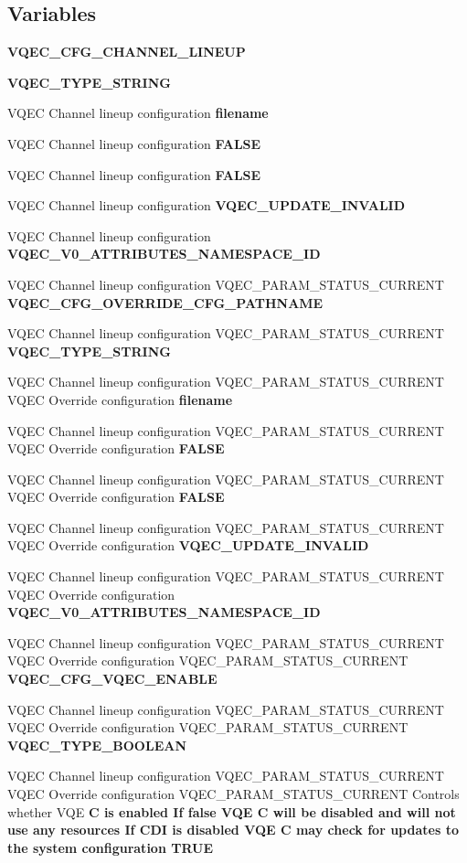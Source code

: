 \subsection*{Variables}
\begin{CompactItemize}
\item 
\bf{VQEC\_\-CFG\_\-CHANNEL\_\-LINEUP}
\item 
\bf{VQEC\_\-TYPE\_\-STRING}
\item 
VQEC Channel lineup configuration \bf{filename}
\item 
VQEC Channel lineup configuration \bf{FALSE}
\item 
VQEC Channel lineup configuration \bf{FALSE}
\item 
VQEC Channel lineup configuration \bf{VQEC\_\-UPDATE\_\-INVALID}
\item 
VQEC Channel lineup configuration \bf{VQEC\_\-V0\_\-ATTRIBUTES\_\-NAMESPACE\_\-ID}
\item 
VQEC Channel lineup configuration VQEC\_\-PARAM\_\-STATUS\_\-CURRENT \bf{VQEC\_\-CFG\_\-OVERRIDE\_\-CFG\_\-PATHNAME}
\item 
VQEC Channel lineup configuration VQEC\_\-PARAM\_\-STATUS\_\-CURRENT \bf{VQEC\_\-TYPE\_\-STRING}
\item 
VQEC Channel lineup configuration VQEC\_\-PARAM\_\-STATUS\_\-CURRENT VQEC Override configuration \bf{filename}
\item 
VQEC Channel lineup configuration VQEC\_\-PARAM\_\-STATUS\_\-CURRENT VQEC Override configuration \bf{FALSE}
\item 
VQEC Channel lineup configuration VQEC\_\-PARAM\_\-STATUS\_\-CURRENT VQEC Override configuration \bf{FALSE}
\item 
VQEC Channel lineup configuration VQEC\_\-PARAM\_\-STATUS\_\-CURRENT VQEC Override configuration \bf{VQEC\_\-UPDATE\_\-INVALID}
\item 
VQEC Channel lineup configuration VQEC\_\-PARAM\_\-STATUS\_\-CURRENT VQEC Override configuration \bf{VQEC\_\-V0\_\-ATTRIBUTES\_\-NAMESPACE\_\-ID}
\item 
VQEC Channel lineup configuration VQEC\_\-PARAM\_\-STATUS\_\-CURRENT VQEC Override configuration VQEC\_\-PARAM\_\-STATUS\_\-CURRENT \bf{VQEC\_\-CFG\_\-VQEC\_\-ENABLE}
\item 
VQEC Channel lineup configuration VQEC\_\-PARAM\_\-STATUS\_\-CURRENT VQEC Override configuration VQEC\_\-PARAM\_\-STATUS\_\-CURRENT \bf{VQEC\_\-TYPE\_\-BOOLEAN}
\item 
VQEC Channel lineup configuration VQEC\_\-PARAM\_\-STATUS\_\-CURRENT VQEC Override configuration VQEC\_\-PARAM\_\-STATUS\_\-CURRENT Controls whether VQE \bf{C} is enabled If false VQE \bf{C} will be disabled and will not use any resources If CDI is disabled VQE \bf{C} may check for updates \bf{to} the system configuration \bf{TRUE}

\end{CompactItemize}
